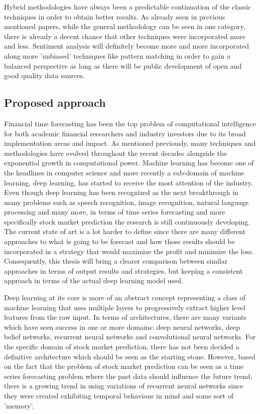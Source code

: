 Hybrid methodologies have always been a predictable continuation of the classic techniques in order to obtain better results. As already seen in previous mentioned papers, while the general methodology can be seen in one category, there is already a decent chance that other techniques were incorporated more and less. Sentiment analysis will definitely become more and more incorporated along more 'unbiased' techniques like pattern matching in order to gain a balanced perspective as long as there will be public development of open and good quality data sources.

\subsection{Proposed approach}
Financial time forecasting has been the top problem of computational intelligence for both academic financial researchers and industry investors due to its broad implementation areas and impact. As mentioned previously, many techniques and methodologies have evolved throughout the recent decades alongside the exponential growth in computational power. Machine learning has become one of the headlines in computer science and more recently a sub-domain of machine learning, deep learning, has started to receive the most attention of the industry. Even though deep learning has been recognized as the next breakthrough in many problems such as speech recognition, image recognition, natural language processing and many more, in terms of time series forecasting and more specifically stock market prediction the research is still continuously developing. The current state of art is a lot harder to define since there are many different approaches to what is going to be forecast and how those results should be incorporated in a strategy that would maximize the profit and minimize the loss. Consequently, this thesis will bring a clearer comparison between similar approaches in terms of output results and strategies, but keeping a consistent approach in terms of the actual deep learning model used.

Deep learning at its core is more of an abstract concept representing a class of machine learning that uses multiple layers to progressively extract higher level features from the raw input. In terms of architectures, there are many variants which have seen success in one or more domains: deep neural networks, deep belief networks, recurrent neural networks and convolutional neural networks. For the specific domain of stock market prediction, there has not been decided a definitive architecture which should be seen as the starting stone. However, based on the fact that the problem of stock market prediction can be seen as a time series forecasting problem where the past data should influence the future trend, there is a growing trend in using variations of recurrent neural networks since they were created exhibiting temporal behaviour in mind and some sort of 'memory'. 

